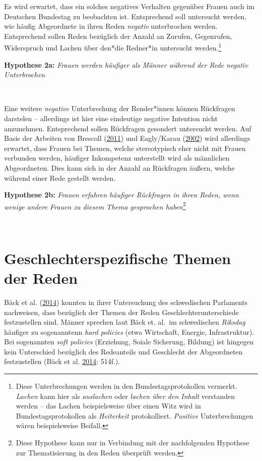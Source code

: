 \documentclass[12pt,ngerman,]{article}
\begin{document}
Es wird erwartet, dass ein solches negatives Verhalten gegenüber Frauen
auch im Deutschen Bundestag zu beobachten ist. Entsprechend soll
untersucht werden, wie häufig Abgeordnete in ihren Reden \emph{negativ}
unterbrochen werden. Entsprechend sollen Reden bezüglich der Anzahl an
Zurufen, Gegenrufen, Widerspruch und Lachen über den*die Redner*in
untersucht werden.\footnote{Diese Unterbrechungen werden in den
  Bundestagsprotokollen vermerkt. \emph{Lachen} kann hier als
  \emph{auslachen} oder \emph{lachen über den Inhalt} verstanden werden
  -- das Lachen beispielsweise über einen Witz wird in
  Bundestagsprotokollen als \emph{Heiterkeit} protokolliert.
  \emph{Positive} Unterbrechungen wären beispielsweise Beifall.}

\textbf{Hypothese 2a:} \emph{Frauen werden häufiger als Männer während
der Rede negativ Unterbrochen}

~

Eine weitere \emph{negative} Unterbrechung der Render*innen können
Rückfragen darstelen -- allerdings ist hier eine eindeutige negative
Intention nicht anzunehmen. Entsprechend sollen Rückfragen gesondert
untersucht werden. Auf Basis der Arbeiten von Brescoll
(\protect\hyperlink{ref-brescoll_2011}{2011}) und Eagly/Karau
(\protect\hyperlink{ref-eagly_2002}{2002}) wird allerdings erwartet,
dass Frauen bei Themen, welche stereotypisch eher nicht mit Frauen
verbunden werden, häufiger Inkompetenz unterstellt wird als männlichen
Abgeordneten. Dies kann sich in der Anzahl an Rückfragen äußern, welche
während einer Rede gestellt werden.

\textbf{Hypothese 2b:} \emph{Frauen erfahren häufiger Rückfragen in
ihren Reden, wenn wenige andere Frauen zu diesem Thema gesprochen
haben}\footnote{Diese Hypothese kann nur in Verbindung mit der
  nachfolgenden Hypothese zur Thematisierung in den Reden überprüft
  werden.}

~

\hypertarget{geschlechterspezifische-themen-der-reden}{%
\section{Geschlechterspezifische Themen der
Reden}\label{geschlechterspezifische-themen-der-reden}}

Bäck et al. (\protect\hyperlink{ref-back_2014}{2014}) konnten in ihrer
Untersuchung des schwedischen Parlaments nachweisen, dass bezüglich der
Themen der Reden Geschlechterunterschiede festzustellen sind. Männer
sprechen laut Bäck et. al.~im schwedischen \emph{Riksdag} häufiger zu
sogenanntenn \emph{hard policies} (etwa Wirtschaft, Energie,
Infrastruktur). Bei sogenannten \emph{soft policies} (Erziehung, Soiale
Sicherung, Bildung) ist hingegen kein Unterschied bezüglich des
Redeanteils und Geschlecht der Abgeordneten festzustellen (Bäck et al.
\protect\hyperlink{ref-back_2014}{2014}: 514f.).
\end{document}
